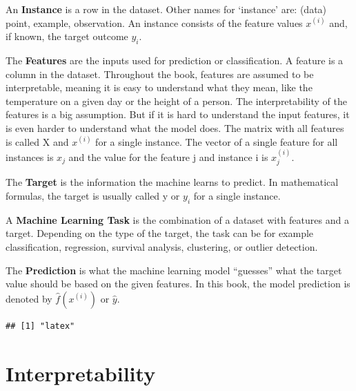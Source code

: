 \documentclass[
  11pt,
]{scrbook}
\begin{document}
An \textbf{Instance} is a row in the dataset.
Other names for `instance' are: (data) point, example, observation.
An instance consists of the feature values \(x^{(i)}\) and, if known, the target outcome \(y_i\).

The \textbf{Features} are the inputs used for prediction or classification.
A feature is a column in the dataset.
Throughout the book, features are assumed to be interpretable, meaning it is easy to understand what they mean, like the temperature on a given day or the height of a person.
The interpretability of the features is a big assumption.
But if it is hard to understand the input features, it is even harder to understand what the model does.
The matrix with all features is called X and \(x^{(i)}\) for a single instance.
The vector of a single feature for all instances is \(x_j\) and the value for the feature j and instance i is \(x^{(i)}_j\).

The \textbf{Target} is the information the machine learns to predict.
In mathematical formulas, the target is usually called y or \(y_i\) for a single instance.

A \textbf{Machine Learning Task} is the combination of a dataset with features and a target.
Depending on the type of the target, the task can be for example classification, regression, survival analysis, clustering, or outlier detection.

The \textbf{Prediction} is what the machine learning model ``guesses'' what the target value should be based on the given features.
In this book, the model prediction is denoted by \(\hat{f}(x^{(i)})\) or \(\hat{y}\).

\begin{verbatim}
## [1] "latex"
\end{verbatim}

\hypertarget{interpretability}{%
\chapter{Interpretability}\label{interpretability}}
\end{document}

